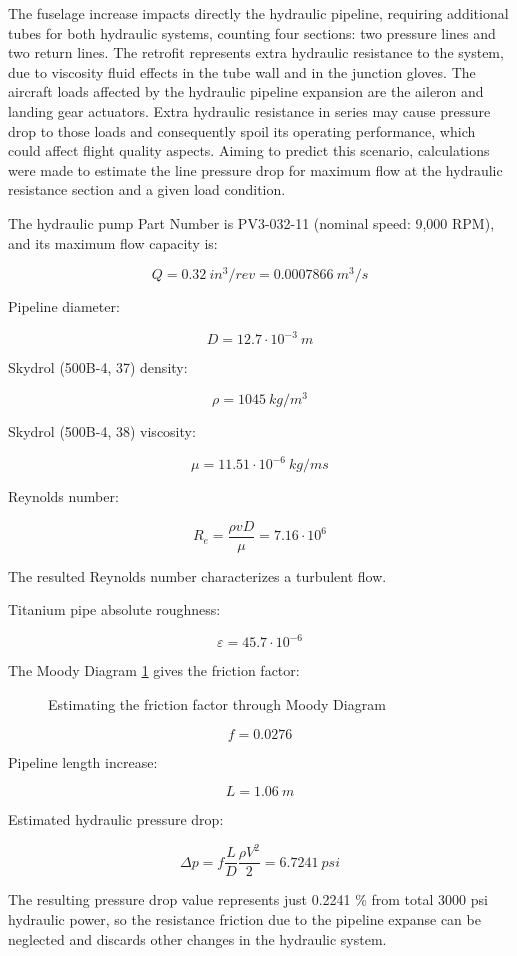 The fuselage increase impacts directly the hydraulic pipeline, requiring additional tubes for both hydraulic systems, counting four sections: two pressure lines and two return lines. The retrofit represents extra hydraulic resistance to the system, due to viscosity fluid effects in the tube wall and in the junction gloves. The aircraft loads affected by the hydraulic pipeline expansion are the aileron and landing gear actuators. Extra hydraulic resistance in series may cause pressure drop to those loads and consequently spoil its operating performance, which could affect flight quality aspects. Aiming to predict this scenario, calculations were made to estimate the line pressure drop for maximum flow at the hydraulic resistance section and a given load condition.

The hydraulic pump Part Number is PV3-032-11 (nominal speed: 9,000 RPM), and its maximum flow capacity is:

\[Q=0.32\ in^{3}/rev=0.0007866\ m^{3}/s\]

Pipeline diameter:

\[D=12.7\cdot 10^{-3}\ m\]

Skydrol (500B-4, 37\celsius) density:

\[\rho =1045\ kg/m^{3}\]

Skydrol (500B-4, 38\celsius) viscosity:

\[\mu =11.51\cdot 10^{-6}\ kg/ms\]

Reynolds number:

\[R_{e}=\frac{\rho vD}{\mu }=7.16\cdot 10^{6}\]

The resulted Reynolds number characterizes a turbulent flow.

Titanium pipe absolute roughness:

\[\varepsilon =45.7\cdot 10^{-6}\]

The Moody Diagram \ref{fig:moody} gives the friction factor:

\begin{figure}[H] %
\caption{Estimating the friction factor through Moody Diagram}
\label{fig:moody}
\end{figure}


\[f=0.0276\]

Pipeline length increase:

\[L=1.06\ m\]

Estimated hydraulic pressure drop:

\[\Delta p=f\frac{L}{D}\frac{\rho V^{2}}{2}=6.7241\ psi\]

The resulting pressure drop value represents just 0.2241 \% from total 3000 psi hydraulic power, so the resistance friction due to the pipeline expanse can be neglected and discards other changes in the hydraulic system.
